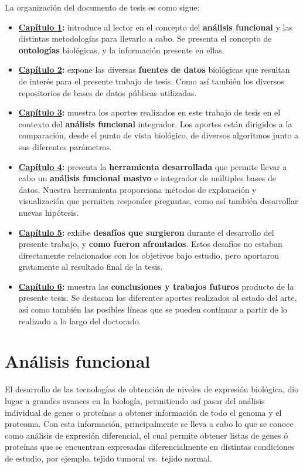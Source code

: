 \documentclass[12pt,twoside]{reedthesis}
\begin{document}
La organización del documento de tesis es como sigue:
\begin{itemize}
\item
  \textbf{\protect\hyperlink{cap:af}{Capítulo 1}:} introduce al lector en el concepto del \textbf{análisis funcional} y las distintas metodologías para llevarlo a cabo. Se presenta el concepto de \textbf{ontologías} biológicas, y la información presente en ellas.
\item
  \textbf{\protect\hyperlink{cap:ngs}{Capítulo 2}:} expone las diversas \textbf{fuentes de datos} biológicas que resultan de interés para el presente trabajo de tesis. Como así también los diversos repositorios de bases de datos públicas utilizadas.
\item
  \textbf{\protect\hyperlink{cap:ifa}{Capítulo 3}:} muestra los aportes realizados en este trabajo de tesis en el contexto del \textbf{análisis funcional} integrador. Los aportes están dirigidos a la comparación, desde el punto de vista biológico, de diversos algoritmos junto a sus diferentes parámetros.
\item
  \textbf{\protect\hyperlink{cap:migsa}{Capítulo 4}:} presenta la \textbf{herramienta desarrollada} que permite llevar a cabo un \textbf{análisis funcional masivo} e integrador de múltiples bases de datos. Nuestra herramienta proporciona métodos de exploración y visualización que permiten responder preguntas, como así también desarrollar nuevas hipótesis.
\item
  \textbf{\protect\hyperlink{cap:desafios}{Capítulo 5}:} exhibe \textbf{desafíos que surgieron} durante el desarrollo del presente trabajo, y \textbf{como fueron afrontados}. Estos desafíos no estaban directamente relacionados con los objetivos bajo estudio, pero aportaron gratamente al resultado final de la tesis.
\item
  \textbf{\protect\hyperlink{cap:conclusiones}{Capítulo 6}:} muestra las \textbf{conclusiones y trabajos futuros} producto de la presente tesis. Se destacan los diferentes aportes realizados al estado del arte, así como también las posibles líneas que se pueden continuar a partir de lo realizado a lo largo del doctorado.
\end{itemize}
\hypertarget{cap:af}{%
\chapter{Análisis funcional}\label{cap:af}}

El desarrollo de las tecnologías de obtención de niveles de expresión biológica, dio lugar a grandes avances en la biología, permitiendo así pasar del análisis individual de genes o proteínas a obtener información de todo el genoma y el proteoma. Con esta información, principalmente se lleva a cabo lo que se conoce como análisis de expresión diferencial, el cual permite obtener listas de genes ó proteínas que se encuentran expresadas diferencialmente en distintas condiciones de estudio, por ejemplo, tejido tumoral vs.~tejido normal.
\end{document}
